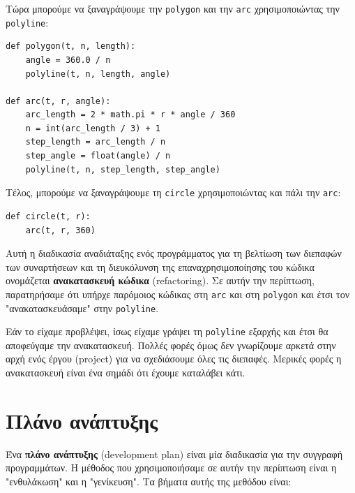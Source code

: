 \documentclass[10pt]{book}
\begin{document}
Τώρα μπορούμε να ξαναγράψουμε την {\tt polygon} και την {\tt arc} χρησιμοποιώντας την {\tt polyline}:

\begin{verbatim}
def polygon(t, n, length):
    angle = 360.0 / n
    polyline(t, n, length, angle)

def arc(t, r, angle):
    arc_length = 2 * math.pi * r * angle / 360
    n = int(arc_length / 3) + 1
    step_length = arc_length / n
    step_angle = float(angle) / n
    polyline(t, n, step_length, step_angle)
\end{verbatim}
%

Τέλος, μπορούμε να ξαναγράψουμε τη {\tt circle} χρησιμοποιώντας και πάλι την {\tt arc}:

\begin{verbatim}
def circle(t, r):
    arc(t, r, 360)
\end{verbatim}
%

Αυτή η διαδικασία αναδιάταξης ενός προγράμματος για τη βελτίωση των διεπαφών των συναρτήσεων και τη διευκόλυνση της επαναχρησιμοποίησης του κώδικα ονομάζεται {\bf ανακατασκευή κώδικα} (refactoring). Σε αυτήν την περίπτωση, παρατηρήσαμε ότι υπήρχε παρόμοιος κώδικας στη {\tt arc} και στη 
{\tt polygon} και έτσι τον "ανακατασκευάσαμε" στην {\tt polyline}.


Εάν το είχαμε προβλέψει, ίσως είχαμε γράψει τη {\tt polyline} εξαρχής και έτσι θα αποφεύγαμε την ανακατασκευή. Πολλές φορές όμως δεν γνωρίζουμε αρκετά στην αρχή ενός έργου (project) για να σχεδιάσουμε όλες τις διεπαφές. Μερικές φορές η ανακατασκευή είναι ένα σημάδι ότι έχουμε καταλάβει κάτι.


\section{Πλάνο ανάπτυξης}

Ένα {\bf πλάνο ανάπτυξης} (development plan) είναι μία διαδικασία για την συγγραφή προγραμμάτων. Η μέθοδος που χρησιμοποιήσαμε σε αυτήν την περίπτωση είναι η "ενθυλάκωση" και η "γενίκευση". Τα βήματα αυτής της μεθόδου είναι:
\end{document}
